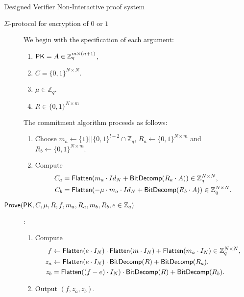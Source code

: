 \begin{section}{Designed Verifier Non-Interactive proof system}
\begin{subsection}{$\Sigma$-protocol for encryption of $0$ or $1$}
\begin{description}
        We begin with the specification of each argument:
        \begin{enumerate}
        \item $\mathsf{PK} = A \in\mathbb{Z}_q^{m \times (n+1)}$,
        \item $C = \{0,1\}^{N \times N}$.
        \item $\mu \in \mathbb{Z}_q$.
        \item $R \in \{0,1\}^{N \times m}$
        \end{enumerate}
        
        The commitment algorithm proceeds as follows:

        \begin{enumerate}
        \item Choose $m_a \gets \{1\}||\{0,1\}^{l-2} \cap \mathbb{Z}_q$, $R_a \gets \{0,1\}^{N \times m}$ and $R_b \gets \{0,1\}^{N \times m}$.
        \item Compute
          \begin{align*}
            C_a  &= {\mathsf{Flatten}}(m_a \cdot Id_{N} + {\mathsf{BitDecomp}}(R_a \cdot A)) \in \mathbb{Z}_q^{N \times N}, \\
            C_b  &= {\mathsf{Flatten}}(-\mu \cdot m_a \cdot Id_{N} + {\mathsf{BitDecomp}}(R_b \cdot A)) \in \mathbb{Z}_q^{N \times N}.
          \end{align*}
        \end{enumerate}

     \item[${\mathsf{Prove}}(\mathsf{PK}, C, \mu, R, f, m_a, R_a, m_b, R_b, e \in \mathbb{Z}_q)$]:
        \begin{enumerate}
        \item Compute 
          \begin{align*}
            f &\gets {\mathsf{Flatten}}(e \cdot I_N) \cdot  {\mathsf{Flatten}}(m \cdot I_N) + {\mathsf{Flatten}}(m_a \cdot I_N) \in \mathbb{Z}_q^{N \times N},\\
            z_a &\gets {\mathsf{Flatten}}(e \cdot I_N)\cdot {\mathsf{BitDecomp}}(R) + {\mathsf{BitDecomp}}(R_a),\\
            z_b &= {\mathsf{Flatten}}((f-e)\cdot I_N) \cdot {\mathsf{BitDecomp}}(R) + {\mathsf{BitDecomp}}(R_b).
          \end{align*}
        \item Output $(f, z_a, z_b)$.
        \end{enumerate}


\end{description}
\end{subsection}
\end{section}
